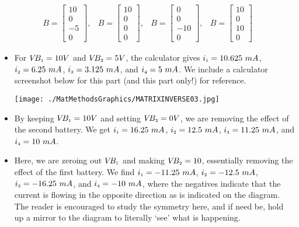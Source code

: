 \documentclass{ximera}
\begin{document}
\begin{example}
\[\begin{array}{cccc}

 B = \left[ \begin{array}{r} 10 \\ 0 \\ -5 \\ 0 \end{array} \right], & 

 B = \left[ \begin{array}{r} 10 \\ 0 \\ 0 \\ 0 \end{array} \right], & 

B = \left[ \begin{array}{r} 0 \\ 0 \\ -10 \\ 0 \end{array} \right], & 

 B = \left[ \begin{array}{r} 10 \\ 0 \\ 10 \\ 0 \end{array} \right] 

\end{array} \]

\begin{itemize}

\item  For $V\!B_{\mbox{\tiny$1$}} = 10 V$ and $V\!B_{\mbox{\tiny$2$}} = 5 V$, the calculator gives $i_{\mbox{\tiny$1$}} = 10.625 \, \, mA$, $i_{\mbox{\tiny$2$}} = 6.25 \, \, mA$, $i_{\mbox{\tiny$3$}} = 3.125 \, \, mA$, and $i_{\mbox{\tiny$4$}} = 5 \, \, mA$.  We include a calculator screenshot below for this part (and this part only!) for reference.


\centerline{\texttt{[image: ./MatMethodsGraphics/MATRIXINVERSE03.jpg]}}


\item  By keeping  $V\!B_{\mbox{\tiny$1$}} = 10 V$ and setting $V\!B_{\mbox{\tiny$2$}} = 0 V$, we are removing the effect of the second battery. We get $i_{\mbox{\tiny$1$}} = 16.25 \, \, mA$, $i_{\mbox{\tiny$2$}} = 12.5 \, \, mA$, $i_{\mbox{\tiny$3$}} = 11.25 \, \, mA$, and $i_{\mbox{\tiny$4$}} = 10 \, \, mA$.  


\item  Here, we  are zeroing out $V\!B_{\mbox{\tiny$1$}}$ and making $V\!B_{\mbox{\tiny$2$}} = 10$, essentially removing the effect of the first battery.  We find $i_{\mbox{\tiny$1$}} = -11.25 \, \, mA$, $i_{\mbox{\tiny$2$}} = -12.5 \, \, mA$, $i_{\mbox{\tiny$3$}} = -16.25 \, \, mA$, and $i_{\mbox{\tiny$4$}} = -10 \, \, mA$, where the negatives indicate that the current is flowing in the opposite direction as is indicated on the diagram. The reader is encouraged to study the symmetry here, and if need be, hold up a mirror to the diagram to literally `see' what is happening.


\end{itemize}
\end{example}
\end{document}
